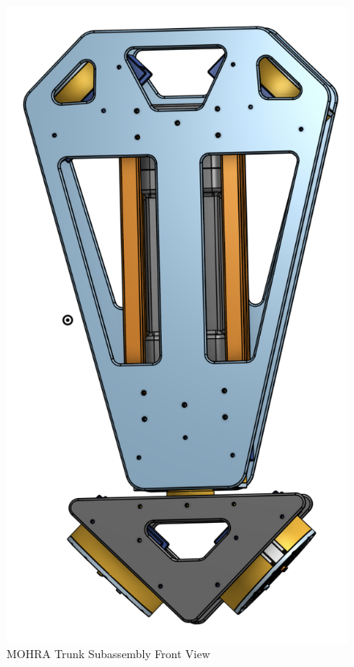 \documentclass{article}
\begin{document}
\begin{figure}[H]
    \centering
    \includegraphics[scale=1]{assets/Design Presentation/Trunk Front View.png}
    \caption{MOHRA Trunk Subassembly Front View}
    \label{fig:enter-label}
\end{figure}
\end{document}
